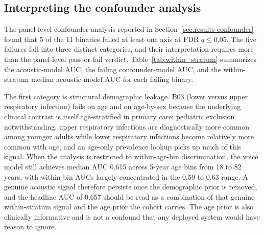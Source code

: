 \documentclass[utf8]{FrontiersinHarvard} %
\begin{document}
\subsection{Interpreting the confounder analysis}
\label{sec:discussion-confounder}

The panel-level confounder analysis reported in Section~\ref{sec:results-confounder} found that 5 of the 11 binaries failed at least one axis at FDR $q \leq 0.05$. The five failures fall into three distinct categories, and their interpretation requires more than the panel-level pass-or-fail verdict. Table~\ref{tab:within_stratum} summarizes the acoustic-model AUC, the failing confounder-model AUC, and the within-stratum median acoustic-model AUC for each failing binary.

The first category is structural demographic leakage. B03 (lower versus upper respiratory infection) fails on age and on age-by-sex because the underlying clinical contrast is itself age-stratified in primary care: pediatric exclusion notwithstanding, upper respiratory infections are diagnostically more common among younger adults while lower respiratory infections become relatively more common with age, and an age-only prevalence lookup picks up much of this signal. When the analysis is restricted to within-age-bin discrimination, the voice model still achieves median AUC 0.615 across 5-year age bins from 18 to 82 years, with within-bin AUCs largely concentrated in the 0.59 to 0.63 range. A genuine acoustic signal therefore persists once the demographic prior is removed, and the headline AUC of 0.657 should be read as a combination of that genuine within-stratum signal and the age prior the cohort carries. The age prior is also clinically informative and is not a confound that any deployed system would have reason to ignore.
\end{document}
